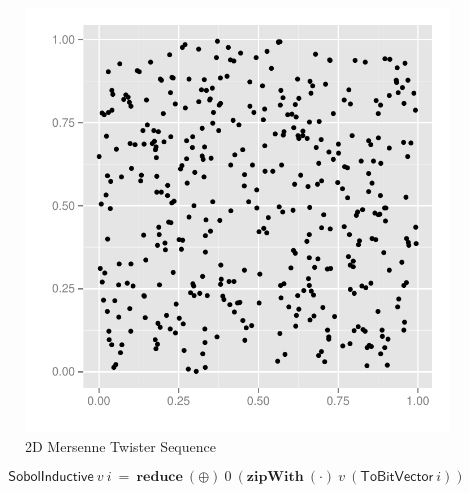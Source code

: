 \documentclass{beamer}
\begin{document}
\begin{frame}
\begin{minipage}[t]{0.48\linewidth}
  \end{minipage}
  \begin{minipage}[t]{0.48\linewidth}
    \begin{figure}
      \centering
      \includegraphics[width=\textwidth]{graphics/2D-mersenne-sequence.pdf}
      \vspace{-5mm}
      \caption{2D Mersenne Twister Sequence}
  \label{fig:2dmersenne}
\end{figure}

  \end{minipage}
  \pause
  \vspace{6mm}
  \begin{equation*}
    \mathsf{SobolInductive}~v~i~=~\textbf{reduce}~(\oplus)~0~(\textbf{zipWith}~(\cdot)~v~(\textsf{ToBitVector}~i))
  \end{equation*}
\end{frame}
\end{document}
